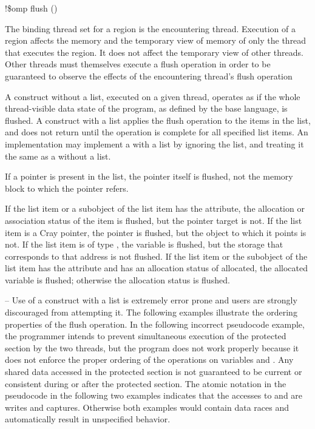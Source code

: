 {{{{\begin{boxedcode}
!\$omp flush \plc{[}()\plc{]}
\end{boxedcode}
\fortranspecificend

\binding
The binding thread set for a  region is the encountering thread. Execution of a 
 region affects the memory and the temporary view of memory of only the thread 
that executes the region. It does not affect the temporary view of other threads. Other 
threads must themselves execute a flush operation in order to be guaranteed to observe 
the effects of the encountering thread’s flush operation

\descr
A  construct without a list, executed on a given thread, operates as if the whole 
thread-visible data state of the program, as defined by the base language, is flushed. A 
 construct with a list applies the flush operation to the items in the list, and does 
not return until the operation is complete for all specified list items. An implementation 
may implement a  with a list by ignoring the list, and treating it the same as a 
 without a list.

\ccppspecificstart
If a pointer is present in the list, the pointer itself is flushed, not the memory block to 
which the pointer refers.
\ccppspecificend

\fortranspecificstart
If the list item or a subobject of the list item has the  attribute, the allocation 
or association status of the  item is flushed, but the pointer target is not. If the 
list item is a Cray pointer, the pointer is flushed, but the object to which it points is not. 
If the list item is of type , the variable is flushed, but the storage that corresponds 
to that address is not flushed. If the list item or the subobject of the list item has the 
 attribute and has an allocation status of allocated, the
allocated variable is flushed; otherwise the allocation status is flushed.
\fortranspecificend

\begin{samepage}
\notestart
\noteheader – Use of a  construct with a list is extremely error prone and users are 
strongly discouraged from attempting it. The following examples illustrate the ordering 
properties of the flush operation. In the following incorrect pseudocode example, the 
programmer intends to prevent simultaneous execution of the protected section by the 
two threads, but the program does not work properly because it does not enforce the 
proper ordering of the operations on variables  and . Any shared data accessed in the 
protected section is not guaranteed to be current or consistent during or after the 
protected section. The atomic notation in the pseudocode in the following two examples 
indicates that the accesses to  and  are  writes and captures. Otherwise both 
examples would contain data races and automatically result in unspecified behavior. 
\end{samepage}

}}}}
